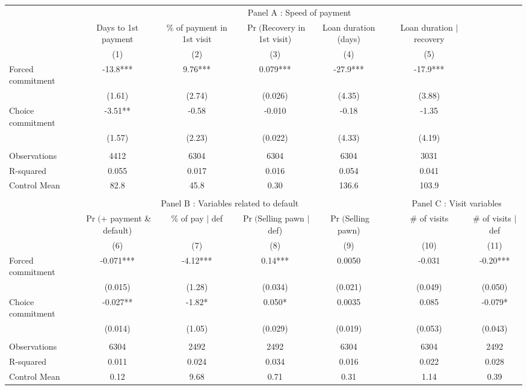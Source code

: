 \begin{tabular}{lccccccc}
\toprule
      & \multicolumn{7}{c}{Panel A  : Speed of payment} \\
\cmidrule{2-8}      & Days to 1st payment & \% of payment in 1st visit & $\Pr($Recovery in 1st visit) & Loan duration (days) &       & Loan duration $|$ recovery &  \\
\cmidrule{1-5}\cmidrule{7-8}      & (1)   & (2)   & (3)   & (4)   &       & (5)   &  \\
\cmidrule{1-5}\cmidrule{7-8}Forced commitment & -13.8*** & 9.76*** & 0.079*** & -27.9*** &       & -17.9*** &  \\
      & (1.61) & (2.74) & (0.026) & (4.35) &       & (3.88) &  \\
Choice commitment & -3.51** & -0.58 & -0.010 & -0.18 &       & -1.35 &  \\
      & (1.57) & (2.23) & (0.022) & (4.33) &       & (4.19) &  \\
      &       &       &       &       &       &       &  \\
\cmidrule{1-5}\cmidrule{7-8}Observations & 4412  & 6304  & 6304  & 6304  &       & 3031  &  \\
R-squared & 0.055 & 0.017 & 0.016 & 0.054 &       & 0.041 &  \\
Control Mean & 82.8  & 45.8  & 0.30  & 136.6 &       & 103.9 &  \\
      &       &       &       &       &       &       &  \\
\midrule
      & \multicolumn{4}{c}{Panel B  : Variables related to default} &       & \multicolumn{2}{c}{Panel C  : Visit variables} \\
\cmidrule{2-8}      & $\Pr($+ payment \& default) & \% of pay $|$ def  & $\Pr($Selling pawn $|$ def) & $\Pr($Selling pawn) &       & \# of visits & \# of visits $|$ def \\
\midrule
\midrule
      & (6)   & (7)   & (8)   & (9)   &       & (10)  & (11) \\
\midrule
\midrule
Forced commitment & -0.071*** & -4.12*** & 0.14*** & 0.0050 &       & -0.031 & -0.20*** \\
      & (0.015) & (1.28) & (0.034) & (0.021) &       & (0.049) & (0.050) \\
Choice commitment & -0.027** & -1.82* & 0.050* & 0.0035 &       & 0.085 & -0.079* \\
      & (0.014) & (1.05) & (0.029) & (0.019) &       & (0.053) & (0.043) \\
      &       &       &       &       &       &       &  \\
\cmidrule{1-5}\cmidrule{7-8}Observations & 6304  & 2492  & 2492  & 6304  &       & 6304  & 2492 \\
R-squared & 0.011 & 0.024 & 0.034 & 0.016 &       & 0.022 & 0.028 \\
Control Mean & 0.12  & 9.68  & 0.71  & 0.31  &       & 1.14  & 0.39 \\
\bottomrule
\bottomrule
\end{tabular}%
